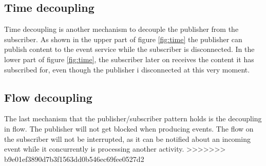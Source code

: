 
\subsection{Time decoupling}
Time decoupling is another mechanism to decouple the publisher from the subscriber. As shown in the upper part of figure \ref{fig:time} the publisher can publish content to the event service while the subscriber is disconnected. In the lower part of figure \ref{fig:time}, the subscriber later on receives the content it has subscribed for, even though the publisher i disconnected at this very moment.

\subsection{Flow decoupling}
The last mechanism that the publisher/subscriber pattern holds is the decoupling in flow. The publisher will not get blocked when producing events. The flow on the subscriber will not be interrupted, as it can be notified about an incoming event while it concurrently is processing another activity.
>>>>>>> b9e01ef3890d7b3f1563dd0b546ec69fee0527d2
